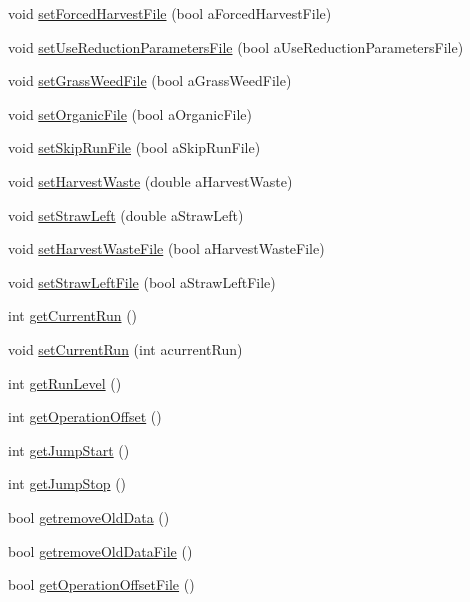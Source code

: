 \begin{DoxyCompactItemize}
\item 
void \hyperlink{classsystem_data_a3e15f78d6dfa9485cfeda6b81478ed28}{setForcedHarvestFile} (bool aForcedHarvestFile)
\item 
void \hyperlink{classsystem_data_a9effb768a403ebc73375ae856c3717ca}{setUseReductionParametersFile} (bool aUseReductionParametersFile)
\item 
void \hyperlink{classsystem_data_a1c5457167f62fa8ae058d401660b1562}{setGrassWeedFile} (bool aGrassWeedFile)
\item 
void \hyperlink{classsystem_data_abe13481b03a050e7d2b40b46c0837279}{setOrganicFile} (bool aOrganicFile)
\item 
void \hyperlink{classsystem_data_a6d5a723d4d137740497fe8e054cb1a54}{setSkipRunFile} (bool aSkipRunFile)
\item 
void \hyperlink{classsystem_data_a6912320cc01f25c656d13e64c3c85407}{setHarvestWaste} (double aHarvestWaste)
\item 
void \hyperlink{classsystem_data_a650b605bf9fee9cca05fa3e7bbf55b62}{setStrawLeft} (double aStrawLeft)
\item 
void \hyperlink{classsystem_data_aa74aae964b4bcb4ed21fec88801ec725}{setHarvestWasteFile} (bool aHarvestWasteFile)
\item 
void \hyperlink{classsystem_data_ad1d266f2b2f0c63142618a32b81ab04b}{setStrawLeftFile} (bool aStrawLeftFile)
\item 
int \hyperlink{classsystem_data_a49821b9ac5d1a6c5d7d8528f5935dcb6}{getCurrentRun} ()
\item 
void \hyperlink{classsystem_data_a3ad4064f55517bdd76aa3d9fd11338a1}{setCurrentRun} (int acurrentRun)
\item 
int \hyperlink{classsystem_data_a0316865ac339bf589380f151202641e6}{getRunLevel} ()
\item 
int \hyperlink{classsystem_data_a72dff726e8a1de5362a1f1afacbfbe39}{getOperationOffset} ()
\item 
int \hyperlink{classsystem_data_a0403b268763c579e28af4c25671b555a}{getJumpStart} ()
\item 
int \hyperlink{classsystem_data_a8a8994a3abe6ffa81049e9af1d67ab78}{getJumpStop} ()
\item 
bool \hyperlink{classsystem_data_a18321bc7027584798d1867afc18b98ef}{getremoveOldData} ()
\item 
bool \hyperlink{classsystem_data_a389a91fba67425ecb0a91f67c739e624}{getremoveOldDataFile} ()
\item 
bool \hyperlink{classsystem_data_a85b31ad14df63adf1e8c87115f9088db}{getOperationOffsetFile} ()

\end{DoxyCompactItemize}
